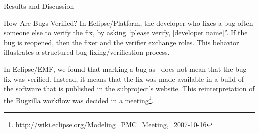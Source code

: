 \begin{section}{Results and Discussion}
\begin{subsection}{How Are Bugs Verified?}
	In Eclipse/Platform, the developer who fixes a bug often someone else to verify the fix, by asking ``please verify, [developer name]''. If the bug is reopened, then the fixer and the verifier exchange roles. This behavior illustrates a structured bug fixing/verification process.
	
	In Eclipse/EMF, we found that marking a bug as \VERIFIED\ does not mean that the bug fix was verified. Instead, it means that the fix was made available in a build of the software that is published in the subproject's website. This reinterpretation of the Bugzilla workflow was decided in a meeting\footnote{\url{http://wiki.eclipse.org/Modeling_PMC_Meeting,_2007-10-16}}.


	





\end{subsection}
\end{section}
